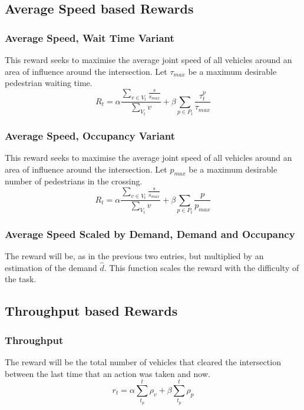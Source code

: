 \documentclass[conference]{IEEEtran}
\begin{document}
\subsection{Average Speed based Rewards}
\subsubsection{Average Speed, Wait Time Variant}
This reward seeks to maximise the average joint speed of all vehicles around an area of influence around the intersection. Let $\tau_{max}$ be a maximum desirable pedestrian waiting time.
\begin{equation}
    R_t = \alpha \frac{\sum_{v \in V_t} \frac{s}{s_{max}}}{\sum_{V_t} v}  + \beta \sum_{p \in P_t} \frac{\tau^p_{t}}{\tau_{max}}
\label{eq:avgspeed_wait}
\end{equation}

\subsubsection{Average Speed, Occupancy Variant}
This reward seeks to maximise the average joint speed of all vehicles around an area of influence around the intersection. Let $p_{max}$ be a maximum desirable number of pedestrians in the crossing.
\begin{equation}
    R_t =   \alpha \frac{ \sum_{v \in V_t} \frac{s}{s_{max}}}{\sum_{V_t} v} + \beta \sum_{p \in P_t} \frac{p}{p_{max}}
\label{eq:avgspeed_occ}
\end{equation}

\subsubsection{Average Speed Scaled by Demand, Demand and Occupancy}
The reward will be, as in the previous two entries, but multiplied by an estimation of the demand $\hat{d}$. This function scales the reward with the difficulty of the task.

\subsection{Throughput based Rewards}
\subsubsection{Throughput}
The reward will be the total number of vehicles that cleared the intersection between the last time that an action was taken and now.
\begin{equation}
    r_t = \alpha \sum_{t_p}^t \rho_v + \beta \sum_{t_p}^t \rho_p
\label{eq:throughput}
\end{equation}
\end{document}
